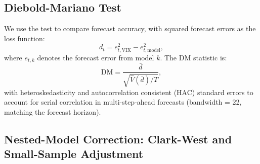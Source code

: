 \documentclass[12pt,a4paper]{article}
\begin{document}
\subsection{Diebold-Mariano Test}

We use the \citet{diebold1995} test to compare forecast accuracy, with squared forecast errors as the loss function:
\begin{equation}
d_t = e_{t,\text{VIX}}^2 - e_{t,\text{model}}^2,
\label{eq:dm}
\end{equation}
where $e_{t,k}$ denotes the forecast error from model $k$. The DM statistic is:
\begin{equation}
\text{DM} = \frac{\bar{d}}{\sqrt{\hat{V}(\bar{d})/T}},
\label{eq:dm_stat}
\end{equation}
with \citet{newey1987} heteroskedasticity and autocorrelation consistent (HAC) standard errors to account for serial correlation in multi-step-ahead forecasts (bandwidth = 22, matching the forecast horizon).

\subsection{Nested-Model Correction: Clark-West and Small-Sample Adjustment}
\label{sec:clark_west}
\end{document}
